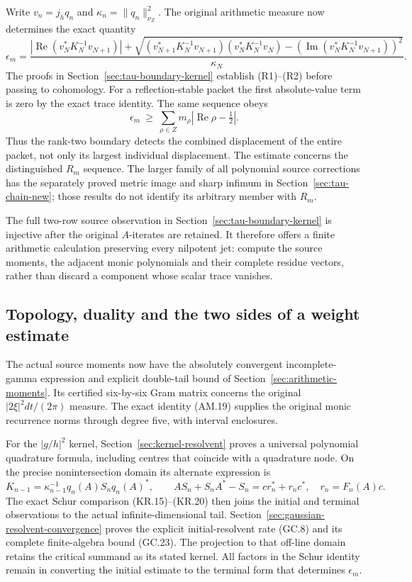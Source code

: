 Write \(v_n=j_hq_n\) and \(\kappa_n=\|q_n\|_{\nu_Z}^2\).
The original arithmetic measure now determines the exact quantity
\[
 \epsilon_m=
 \frac{|\operatorname{Re}(v_N^*K_N^{-1}v_{N+1})|
 +\sqrt{(v_{N+1}^*K_N^{-1}v_{N+1})(v_N^*K_N^{-1}v_N)
       -(\operatorname{Im}(v_N^*K_N^{-1}v_{N+1}))^2}}
      {\kappa_N}.
 \tag{R2}
\]
The proofs in Section~\ref{sec:tau-boundary-kernel} establish
(R1)--(R2) before passing to cohomology.
For a reflection-stable packet the first absolute-value term is
zero by the exact trace identity. The same sequence obeys
\[
 \epsilon_m\ \geq\
       \sum_{\rho\in Z}m_\rho
                   |\operatorname{Re}\rho-\tfrac12|.
 \tag{R3}
\]
Thus the rank-two boundary detects the combined displacement of
the entire packet, not only its largest individual displacement.
The estimate concerns the distinguished \(R_m\) sequence.
The larger family of all polynomial source corrections has the
separately proved metric image and sharp infimum in
Section~\ref{sec:tau-chain-new}; those results do not identify
its arbitrary member with \(R_m\).

The full two-row source observation in
Section~\ref{sec:tau-boundary-kernel} is injective after the
original \(A\)-iterates are retained. It therefore offers a
finite arithmetic calculation preserving every nilpotent jet:
compute the source moments, the adjacent monic polynomials and
their complete residue vectors, rather than discard a component
whose scalar trace vanishes.

\subsection{Topology, duality and the two sides of a weight estimate}
The actual source moments now have the absolutely convergent
incomplete-gamma expression and explicit double-tail bound of
Section~\ref{sec:arithmetic-moments}. Its certified six-by-six
Gram matrix concerns the original \(|2\xi|^2dt/(2\pi)\) measure.
The exact identity (AM.19) supplies the original monic recurrence
norms through degree five, with interval enclosures.

For the \(|g/h|^2\) kernel, Section~\ref{sec:kernel-resolvent}
proves a universal polynomial quadrature formula, including
centres that coincide with a quadrature node. On the precise
nonintersection domain its alternate expression is
\[
 K_{n-1}=\kappa_{n-1}^{-1}q_n(A)S_nq_n(A)^*,\qquad
 AS_n+S_nA^*-S_n=cr_n^*+r_nc^*,\quad r_n=F_n(A)c.
\]
The exact Schur comparison (KR.15)--(KR.20) then joins the initial
and terminal observations to the actual infinite-dimensional tail.
Section~\ref{sec:gaussian-resolvent-convergence} proves the explicit
initial-resolvent rate (GC.8) and its complete finite-algebra
bound (GC.23). The projection to that off-line domain retains
the critical summand as its stated kernel. All factors in the
Schur identity remain in converting the initial estimate to the
terminal form that determines \(\epsilon_m\).

